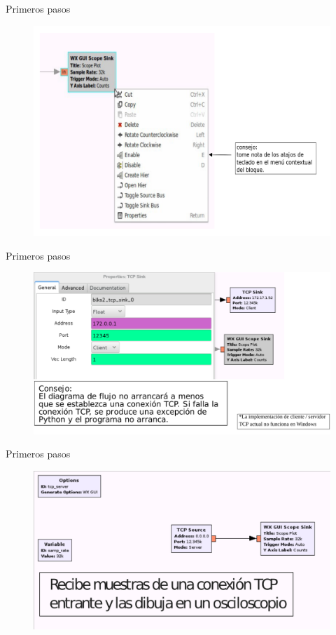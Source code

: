 \begin{frame}{Primeros pasos}
\begin{figure}[H]
\centering
\includegraphics[width=\textwidth, height=0.6\textwidth]{lab1/pdf/lab123.pdf}
\end{figure}
\end{frame}

\begin{frame}{Primeros pasos}
\begin{figure}[H]
\centering
\includegraphics[width=\textwidth]{lab1/pdf/lab124.pdf}
\end{figure}
\end{frame}

\begin{frame}{Primeros pasos}
\begin{figure}[H]
\centering
\includegraphics[width=\textwidth]{lab1/pdf/lab125.pdf}
\end{figure}
\end{frame}

